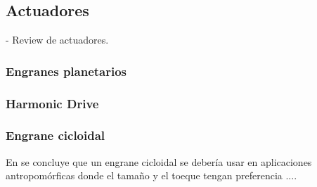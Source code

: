 \subsection{Actuadores}\label{sec:actuadores}

\cite{Pham2018} - Review de actuadores.

\subsubsection{Engranes planetarios}
\subsubsection{Harmonic Drive}
\subsubsection{Engrane cicloidal}

En \cite{Sensinger2012} se concluye que un engrane cicloidal se debería usar en aplicaciones antropomórficas donde el tamaño y el toeque tengan preferencia ....


